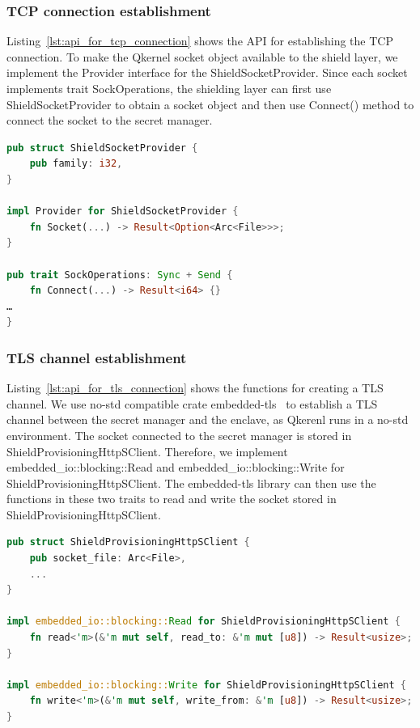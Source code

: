 \subsubsection{TCP connection establishment}

Listing~\ref{lst:api_for_tcp_connection} shows the API for establishing the TCP connection. To make the Qkernel socket object available to the shield layer, we implement the Provider interface for the ShieldSocketProvider. Since each socket implements trait SockOperations, the shielding layer can 
first use ShieldSocketProvider to obtain a socket object and then use Connect() method to connect the socket to the secret manager.

\begin{lstlisting}[language=rust, caption= API for establishing the TCP connection, label={lst:api_for_tcp_connection}]
pub struct ShieldSocketProvider {
    pub family: i32,
}

impl Provider for ShieldSocketProvider {
    fn Socket(...) -> Result<Option<Arc<File>>>;
}

pub trait SockOperations: Sync + Send {
    fn Connect(...) -> Result<i64> {}
…
}    
\end{lstlisting}

\subsubsection{TLS channel establishment}
Listing~\ref{lst:api_for_tls_connection} shows the functions for creating a TLS channel. We use no-std compatible crate embedded-tls~\cite*{embede_tls}  to establish a TLS channel between the secret manager and the enclave, as Qkerenl runs in a no-std environment. The socket connected to the secret manager is stored in 
ShieldProvisioningHttpSClient. Therefore, we implement embedded\_io::blocking::Read and embedded\_io::blocking::Write for ShieldProvisioningHttpSClient. The embedded-tls library can then use the functions in these two traits to read and write 
the socket stored in ShieldProvisioningHttpSClient.

\begin{lstlisting}[language=rust, caption= API for establishing the TLS channel, label={lst:api_for_tls_connection}]
pub struct ShieldProvisioningHttpSClient {
    pub socket_file: Arc<File>,
    ...
}

impl embedded_io::blocking::Read for ShieldProvisioningHttpSClient {
    fn read<'m>(&'m mut self, read_to: &'m mut [u8]) -> Result<usize>;
}

impl embedded_io::blocking::Write for ShieldProvisioningHttpSClient {
    fn write<'m>(&'m mut self, write_from: &'m [u8]) -> Result<usize>;
}
\end{lstlisting}
